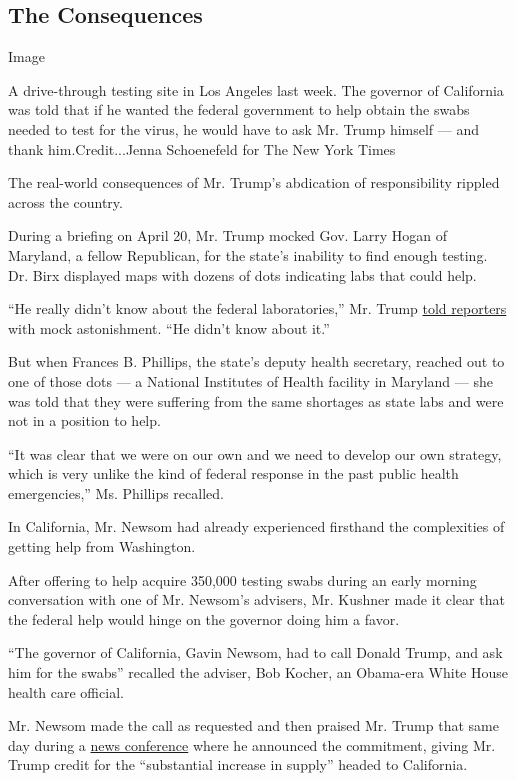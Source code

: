 \hypertarget{the-consequences}{%
\subsection{The Consequences}\label{the-consequences}}

Image

A drive-through testing site in Los Angeles last week. The governor of
California was told that if he wanted the federal government to help
obtain the swabs needed to test for the virus, he would have to ask Mr.
Trump himself --- and thank him.Credit...Jenna Schoenefeld for The New
York Times

The real-world consequences of Mr. Trump's abdication of responsibility
rippled across the country.

During a briefing on April 20, Mr. Trump mocked Gov. Larry Hogan of
Maryland, a fellow Republican, for the state's inability to find enough
testing. Dr. Birx displayed maps with dozens of dots indicating labs
that could help.

``He really didn't know about the federal laboratories,'' Mr. Trump
\href{https://www.whitehouse.gov/briefings-statements/remarks-president-trump-vice-president-pence-members-coronavirus-task-force-press-briefing-29/}{told
reporters} with mock astonishment. ``He didn't know about it.''

But when Frances B. Phillips, the state's deputy health secretary,
reached out to one of those dots --- a National Institutes of Health
facility in Maryland --- she was told that they were suffering from the
same shortages as state labs and were not in a position to help.

``It was clear that we were on our own and we need to develop our own
strategy, which is very unlike the kind of federal response in the past
public health emergencies,'' Ms. Phillips recalled.

In California, Mr. Newsom had already experienced firsthand the
complexities of getting help from Washington.

After offering to help acquire 350,000 testing swabs during an early
morning conversation with one of Mr. Newsom's advisers, Mr. Kushner made
it clear that the federal help would hinge on the governor doing him a
favor.

``The governor of California, Gavin Newsom, had to call Donald Trump,
and ask him for the swabs'' recalled the adviser, Bob Kocher, an
Obama-era White House health care official.

Mr. Newsom made the call as requested and then praised Mr. Trump that
same day during a
\href{https://www.facebookcorewwwi.onion/CAgovernor/videos/686605895491026/}{news
conference} where he announced the commitment, giving Mr. Trump credit
for the ``substantial increase in supply'' headed to California.

